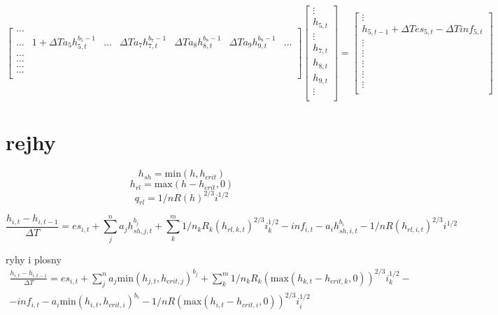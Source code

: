 \documentclass{article}
\begin{document}
\begin{equation}
\begin{bmatrix}
\hdots& & & & & &  \\
\hdots  & 1+\Delta T a_5h^{b_{5}-1}_{5,t} & \hdots &  \Delta T a_7h^{b_{7}-1}_{7,t} &  \Delta T a_8h^{b_{8}-1}_{8,t} & \Delta T a_9 h^{b_{9}-1}_{9,t} & \hdots \\
\hdots&  & & & & &  \\
\hdots& && &  &  & \\
\hdots& && &  &   & \\
\hdots& && &  &   & \\

\end{bmatrix} 
% 
\begin{bmatrix}
 \vdots \\
 h_{5,t} \\
 \vdots \\
 h_{7,t} \\
 h_{8,t} \\
 h_{9,t} \\
 \vdots \\
%  
\end{bmatrix}
=
\begin{bmatrix}
 \vdots \\
h_{5,t-1} + \Delta T es_{5,t} - \Delta T inf_{5,t} \\
 \vdots \\
 \vdots \\
 \vdots \\
 \vdots \\
 \vdots \\
%  
\end{bmatrix}
\end{equation}


\newpage
\section*{rejhy}


$$
h_{sh} = \text{min}(h,h_{crit})
$$
$$
h_{rl} = \text{max}(h-h_{crit},0)
$$
$$
q_{rl} = 1/n R(h)^{2/3} i^{1/2}
$$



$$
  \frac{h_{i,t} - h_{i,t-1} }{\Delta T} = 
  es_{i,t} + \sum_j^n a_jh^{b_{j}}_{sh,j,t}  + \sum_k^m 1/n_k R_k(h_{rl,k,t})^{2/3} i_k^{1/2} - inf_{i,t} - a_ih^{b_{i}}_{sh,i,t} - 1/n R(h_{rl,i,t})^{2/3} i^{1/2}
$$


ryhy i plosny
\begin{multline}
  \frac{h_{i,t} - h_{i,t-1} }{\Delta T} =
  es_{i,t} 
  + \sum_j^n a_j \text{min}(h_{j,t},h_{crit,j})^{b_{j}}  + \sum_k^m 1/n_k R_k(\text{max}(h_{k,t}-h_{crit,k},0))^{2/3} i_k^{1/2} - \\
  - inf_{i,t} 
  - a_i\text{min}(h_{i,t},h_{crit,i})^{b_{i}} - 1/n R(\text{max}(h_{i,t}-h_{crit,i},0))^{2/3} i_i^{1/2}
\end{multline}
\end{document}
